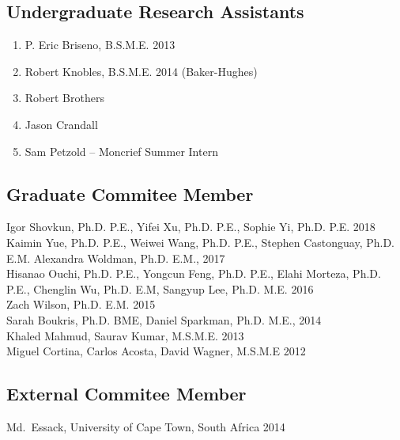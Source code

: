 \subsection*{Undergraduate Research Assistants}
  \begin{enumerate}
    \item P. Eric Briseno, B.S.M.E. 2013
    \item Robert Knobles, B.S.M.E. 2014 (Baker-Hughes)
    \item Robert Brothers
    \item Jason Crandall
    \item Sam Petzold -- Moncrief Summer Intern
  \end{enumerate}

\subsection*{Graduate Commitee Member}
Igor Shovkun, Ph.D. P.E., Yifei Xu, Ph.D. P.E., Sophie Yi, Ph.D. P.E. 2018 \\
Kaimin Yue, Ph.D. P.E., Weiwei Wang, Ph.D. P.E., Stephen Castonguay, Ph.D. E.M. Alexandra Woldman, Ph.D. E.M., 2017 \\ 
Hisanao Ouchi, Ph.D. P.E., Yongcun Feng, Ph.D. P.E., Elahi Morteza, Ph.D. P.E., Chenglin Wu, Ph.D. E.M, Sangyup Lee, Ph.D. M.E. 2016 \\
Zach Wilson, Ph.D. E.M. 2015\\
Sarah Boukris, Ph.D. BME, Daniel Sparkman, Ph.D. M.E., 2014 \\
Khaled Mahmud, Saurav Kumar, M.S.M.E. 2013 \\
Miguel Cortina, Carlos Acosta, David Wagner, M.S.M.E 2012 

\subsection*{External Commitee Member}
Md.~Essack, University of Cape Town, South Africa 2014

